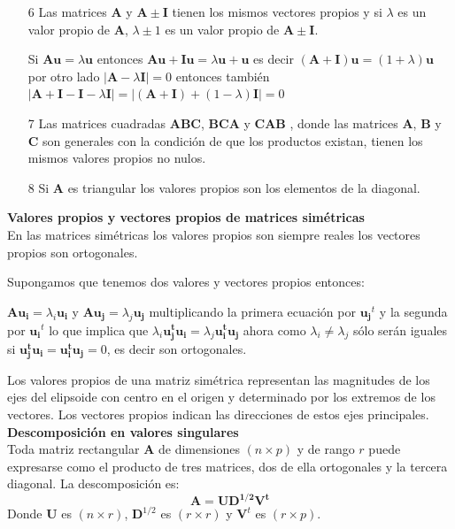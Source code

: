 \documentclass[12pt,letterpaper]{report} %
\begin{document}
\begin{itemize}
\item[6] Las matrices $\mathbf{A}$ y $\mathbf{A\pm I}$ tienen los mismos vectores propios y si $\lambda$ es un valor propio de $\mathbf{A}$, $\lambda \pm 1$ es un valor propio de $\mathbf{A\pm I}$.

Si $\mathbf{Au}=\lambda \mathbf{u}$ entonces $\mathbf{Au+ Iu}=\lambda \mathbf{u}+ \mathbf{u}$ es decir $(\mathbf{A+ I})\mathbf{u}=(1+\lambda) \mathbf{u}$ por otro lado $|\mathbf{A}-\lambda \mathbf{I}|=0$ entonces también $|\mathbf{A+I-I}-\lambda \mathbf{I}|=|(\mathbf{A+I})+(1-\lambda) \mathbf{I}|=0$

\item[7] Las matrices cuadradas $\mathbf{ABC}$, $\mathbf{BCA}$ y $\mathbf{CAB}$ , donde las matrices $\mathbf{A}$, $\mathbf{B}$ y $\mathbf{C}$ son generales con la condición de que los productos existan, tienen los mismos valores propios no nulos.

\item[8] Si $\mathbf{A}$ es triangular los valores propios son los elementos de la diagonal.
\end{itemize}

\textbf{Valores propios y vectores propios de matrices simétricas} \\

En las matrices simétricas los valores propios son siempre reales los vectores propios son ortogonales.

Supongamos que tenemos dos valores y vectores propios entonces: 

$\mathbf{Au_{i}}=\lambda_{i}\mathbf{u_{i}}$ y  $\mathbf{Au_{j}}=\lambda_{j}\mathbf{u_{j}}$ multiplicando la primera ecuación por $\mathbf{u_{j}}^t$ y la segunda por $\mathbf{u_{i}}^t$ lo que implica que  $\lambda_{i}\mathbf{u_{j}^tu_{i}}=\lambda_{j}\mathbf{u_{i}^tu_{j}}$ ahora como $\lambda_{i} \ne \lambda_{j}$ sólo serán iguales si $\mathbf{u_{j}^tu_{i}}=\mathbf{u_{i}^tu_{j}}=0$, es decir son ortogonales.

Los valores propios de una matriz simétrica representan las magnitudes de los ejes del elipsoide con centro en el origen y determinado por los extremos de los vectores. Los vectores propios indican las direcciones de estos ejes principales.\\

\textbf{Descomposición en valores singulares} \\

Toda matriz rectangular $\mathbf{A}$ de dimensiones $(n\times p)$ y de rango $r$ puede expresarse como el producto de tres matrices, dos de ella ortogonales y la tercera diagonal. La descomposición es:
$$\mathbf{A}=\mathbf{UD^{1/2}V^t}$$
Donde $\mathbf{U}$ es $(n \times r)$, $\mathbf{D}^{1/2}$ es $(r \times r)$ y $\mathbf{V}^t$ es $(r \times p)$.
\end{document}
